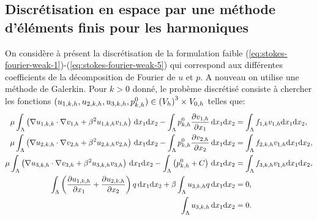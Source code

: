 \subsection{Discrétisation en espace par une méthode d'éléments finis pour les harmoniques}\label{sec:harmonic-discr-harm}
On considère à présent la discrétisation de la formulation
faible
(\ref{eq:stokes-fourier-weak-1})-(\ref{eq:stokes-fourier-weak-5}) qui
correspond aux différentes coefficients de la décomposition de
Fourier de $u$ et $p$. A nouveau on utilise une méthode de
Galerkin. Pour $k > 0$ donné, le probème discrétisé consiste
à chercher les fonctions $(u_{1,k,h}, u_{2,k,h}, u_{3,k,h}, p^0_{k,h})\in
\left( V_h \right)^3\times V_{0,h}$ telles que:
\begin{align}
  \mu \int_\Lambda \parent{\nabla u_{1,k,k}\cdot \nabla v_{1,h} %
                           + \beta^2 u_{1,k,h}v_{1,h}}\,\mathrm dx_1\mathrm dx_2 %
  - \int_\Lambda p_{k,h}^0\frac{\partial v_{1,h}}{\partial x_1}\,\mathrm dx_1\mathrm dx_2 %
  &= \int_\Lambda f_{1,k}v_{1,h}\mathrm dx_1\mathrm dx_2, \label{eq:stokes-fourier-discr-weak-1}\\
  \mu \int_\Lambda \parent{\nabla u_{2,k,h}\cdot \nabla v_{2,h} %
                           + \beta^2 u_{2,k,h}v_{2,h}}\,\mathrm dx_1\mathrm dx_2 %
  - \int_\Lambda p_{k,h}^0\frac{\partial v_{2,h}}{\partial x_2}\,\mathrm dx_1\mathrm dx_2 %
  &= \int_\Lambda f_{2,k,h}v_{1,h}\mathrm dx_1\mathrm dx_2, \label{eq:stokes-fourier-discr-weak-2}\\
  \mu \int_\Lambda \parent{\nabla u_{3,k,h}\cdot \nabla v_{3,h} %
                           + \beta^2 u_{3,k,h}v_{3,h}}\,\mathrm dx_1\mathrm dx_2 %
  - \int_\Lambda \parent{p_{k,h}^0 + C}\,\mathrm dx_1\mathrm dx_2 %
  &= \int_\Lambda f_{3,k,h}v_{1,h}\mathrm dx_1\mathrm dx_2, \label{eq:stokes-fourier-discr-weak-3}\\
  \int_\Lambda \parent{\frac{\partial u_{1,k,h}}{\partial x_1} %
                       + \frac{\partial u_{2,k,h}}{\partial x_2}}q\,\mathrm dx_1\mathrm dx_2 %
  + \beta\int_\Lambda u_{3,k,h}q\,\mathrm dx_1\mathrm dx_2 %
  &= 0,\label{eq:stokes-fourier-discr-weak-4}\\
  \int_\Lambda u_{3,k,h}\,\mathrm dx_1\mathrm dx_2 %
  &= 0. \label{eq:stokes-fourier-discr-weak-5}
\end{align}

